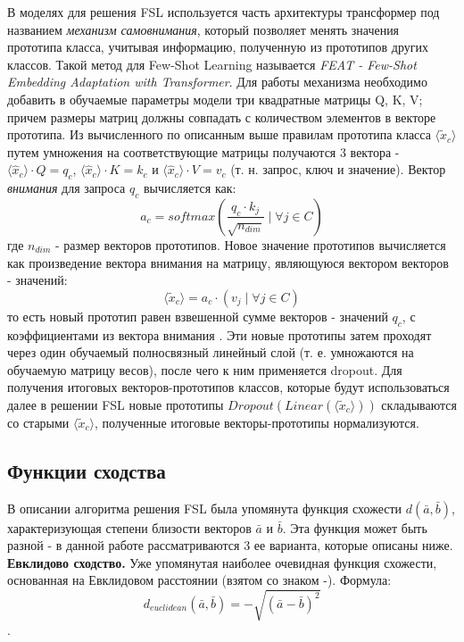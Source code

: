 \documentclass[a4paper, 12pt]{report}
\begin{document}
В моделях для решения FSL используется часть архитектуры трансформер под названием \textit{механизм самовнимания}, который позволяет менять значения прототипа класса, учитывая информацию, полученную из прототипов других классов. Такой метод для Few-Shot Learning называется \textit{FEAT - Few-Shot Embedding Adaptation with Transformer}. Для работы механизма необходимо добавить в обучаемые параметры модели три квадратные матрицы Q, K, V; причем размеры матриц должны совпадать с количеством элементов в векторе прототипа. Из вычисленного по описанным выше правилам прототипа класса $\langle \tilde{x}_c \rangle$ путем умножения на соответствующие матрицы получаются 3 вектора - $\langle \hat{x}_c \rangle \cdot Q = q_{c}$, $\langle \hat{x}_c \rangle \cdot K = k_{c}$ и $\langle \hat{x}_c \rangle \cdot V = v_{c}$ (т. н. запрос, ключ и значение). Вектор \textit{внимания} для запроса $q_{c}$ вычисляется как: $$a_{c} = softmax\left(\frac{q_{c} \cdot k_{j}}{\sqrt{n_{dim}}} \; | \;  \forall j \in C \right)$$ где $n_{dim}$ - размер векторов прототипов. Новое значение прототипов вычисляется как произведение вектора внимания на матрицу, являющуюся вектором векторов - значений: $$\langle \tilde{x}_c \rangle = a_{c} \cdot \left( v_{j}  \; | \;  \forall j \in C  \right)$$ то есть новый прототип равен взвешенной сумме векторов - значений $q_{c}$, с коэффициентами из вектора внимания . Эти новые прототипы затем проходят через один обучаемый полносвязный линейный слой (т. е. умножаются на обучаемую матрицу весов), после чего к ним применяется dropout. Для получения итоговых векторов-прототипов классов, которые будут использоваться далее в решении FSL новые прототипы $Dropout \left(Linear \left( \langle \tilde{x}_c \rangle \right) \right)$ складываются со старыми $\langle \tilde{x}_c \rangle$, полученные итоговые векторы-прототипы нормализуются.

\subsection{Функции сходства}

В описании алгоритма решения FSL была упомянута функция схожести $d(\bar{a}, \bar{b})$, характеризующая степени близости векторов $\bar{a}$ и $\bar{b}$. Эта функция может быть разной - в данной работе рассматриваются 3 ее варианта, которые описаны ниже. \\

\textbf {Евклидово сходство.} Уже упомянутая наиболее очевидная функция схожести, основанная на Евклидовом расстоянии (взятом со знаком -). Формула: $$d_{euclidean}(\bar{a}, \bar{b}) = -\sqrt{{(\bar{a} - \bar{b})}^2}$$.\\
\end{document}
